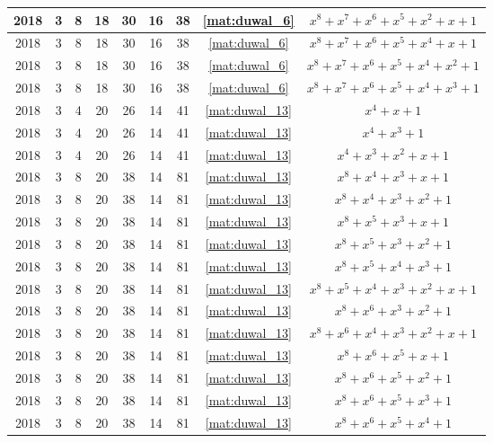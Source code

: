 \begin{longtable}{|c|c|c|c|c|c|c|c|c|}
2018 & 3 & 8 & 18 & 30 & 16 & 38 & \eqref{mat:duwal_6} & $x^8 + x^7 + x^6 + x^5 + x^2 + x + 1$ \\ \hline 
2018 & 3 & 8 & 18 & 30 & 16 & 38 & \eqref{mat:duwal_6} & $x^8 + x^7 + x^6 + x^5 + x^4 + x + 1$ \\ \hline 
2018 & 3 & 8 & 18 & 30 & 16 & 38 & \eqref{mat:duwal_6} & $x^8 + x^7 + x^6 + x^5 + x^4 + x^2 + 1$ \\ \hline 
2018 & 3 & 8 & 18 & 30 & 16 & 38 & \eqref{mat:duwal_6} & $x^8 + x^7 + x^6 + x^5 + x^4 + x^3 + 1$ \\ \hline 
2018 & 3 & 4 & 20 & 26 & 14 & 41 & \eqref{mat:duwal_13} & $x^4 + x + 1$ \\ \hline 
2018 & 3 & 4 & 20 & 26 & 14 & 41 & \eqref{mat:duwal_13} & $x^4 + x^3 + 1$ \\ \hline 
2018 & 3 & 4 & 20 & 26 & 14 & 41 & \eqref{mat:duwal_13} & $x^4 + x^3 + x^2 + x + 1$ \\ \hline 
2018 & 3 & 8 & 20 & 38 & 14 & 81 & \eqref{mat:duwal_13} & $x^8 + x^4 + x^3 + x + 1$ \\ \hline 
2018 & 3 & 8 & 20 & 38 & 14 & 81 & \eqref{mat:duwal_13} & $x^8 + x^4 + x^3 + x^2 + 1$ \\ \hline 
2018 & 3 & 8 & 20 & 38 & 14 & 81 & \eqref{mat:duwal_13} & $x^8 + x^5 + x^3 + x + 1$ \\ \hline 
2018 & 3 & 8 & 20 & 38 & 14 & 81 & \eqref{mat:duwal_13} & $x^8 + x^5 + x^3 + x^2 + 1$ \\ \hline 
2018 & 3 & 8 & 20 & 38 & 14 & 81 & \eqref{mat:duwal_13} & $x^8 + x^5 + x^4 + x^3 + 1$ \\ \hline 
2018 & 3 & 8 & 20 & 38 & 14 & 81 & \eqref{mat:duwal_13} & $x^8 + x^5 + x^4 + x^3 + x^2 + x + 1$ \\ \hline 
2018 & 3 & 8 & 20 & 38 & 14 & 81 & \eqref{mat:duwal_13} & $x^8 + x^6 + x^3 + x^2 + 1$ \\ \hline 
2018 & 3 & 8 & 20 & 38 & 14 & 81 & \eqref{mat:duwal_13} & $x^8 + x^6 + x^4 + x^3 + x^2 + x + 1$ \\ \hline 
2018 & 3 & 8 & 20 & 38 & 14 & 81 & \eqref{mat:duwal_13} & $x^8 + x^6 + x^5 + x + 1$ \\ \hline 
2018 & 3 & 8 & 20 & 38 & 14 & 81 & \eqref{mat:duwal_13} & $x^8 + x^6 + x^5 + x^2 + 1$ \\ \hline 
2018 & 3 & 8 & 20 & 38 & 14 & 81 & \eqref{mat:duwal_13} & $x^8 + x^6 + x^5 + x^3 + 1$ \\ \hline 
2018 & 3 & 8 & 20 & 38 & 14 & 81 & \eqref{mat:duwal_13} & $x^8 + x^6 + x^5 + x^4 + 1$ \\ \hline 

\end{longtable}
